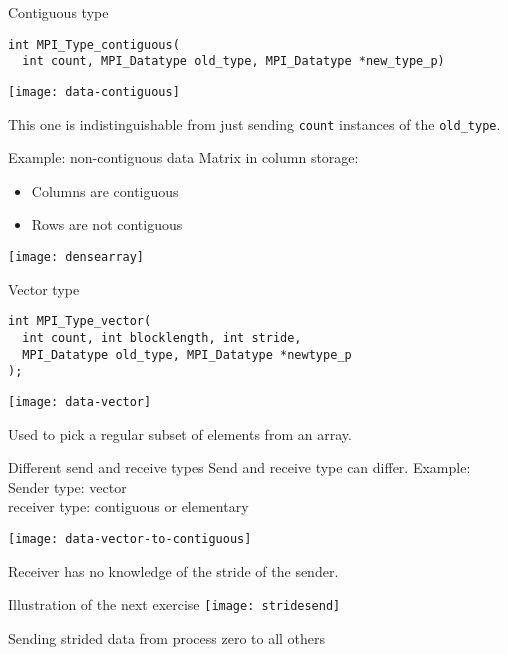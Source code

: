 \begin{numberedframe}{Contiguous type}
\lstset{language=C}
\begin{lstlisting}
int MPI_Type_contiguous(
  int count, MPI_Datatype old_type, MPI_Datatype *new_type_p)  
\end{lstlisting}
  \texttt{[image: data-contiguous]}

This one is indistinguishable from just sending \lstinline{count} instances
of the \lstinline{old_type}.
\end{numberedframe}

\begin{numberedframe}{Example: non-contiguous data}
  Matrix in column storage:
  \begin{itemize}
  \item Columns are contiguous
  \item Rows are not contiguous
  \end{itemize}
  \texttt{[image: densearray]}
\end{numberedframe}

\begin{numberedframe}{Vector type}
\begin{lstlisting}
int MPI_Type_vector(
  int count, int blocklength, int stride,
  MPI_Datatype old_type, MPI_Datatype *newtype_p
);  
\end{lstlisting}
  \texttt{[image: data-vector]}

Used to pick a regular subset of elements from an array.
\end{numberedframe}

\begin{numberedframe}{}
\end{numberedframe}

\begin{numberedframe}{Different send and receive types}
  Send and receive type can differ. Example:\\
  Sender type: vector\\ receiver type: contiguous or elementary

  \texttt{[image: data-vector-to-contiguous]}

  Receiver has no knowledge of the stride of the sender.
\end{numberedframe}

\begin{numberedframe}{Illustration of the next exercise}
  \label{fig:stridesend}
  \texttt{[image: stridesend]}

  Sending strided data from process zero to all others
\end{numberedframe}

